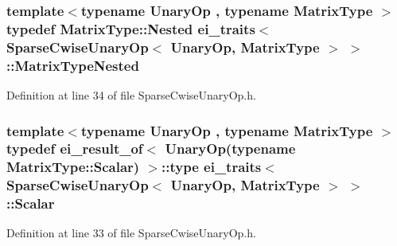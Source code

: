 \hypertarget{structei__traits_3_01_sparse_cwise_unary_op_3_01_unary_op_00_01_matrix_type_01_4_01_4_a7e6d89c823ad15cabb91e353ed6b4786}{
\subsubsection[{Matrix\-Type\-Nested}]{\setlength{\rightskip}{0pt plus 5cm}template$<$typename Unary\-Op , typename Matrix\-Type $>$ typedef Matrix\-Type\-::\-Nested {\bf ei\-\_\-traits}$<$ {\bf Sparse\-Cwise\-Unary\-Op}$<$ Unary\-Op, Matrix\-Type $>$ $>$\-::{\bf Matrix\-Type\-Nested}}}\label{structei__traits_3_01_sparse_cwise_unary_op_3_01_unary_op_00_01_matrix_type_01_4_01_4_a7e6d89c823ad15cabb91e353ed6b4786}


Definition at line 34 of file Sparse\-Cwise\-Unary\-Op.\-h.

\hypertarget{structei__traits_3_01_sparse_cwise_unary_op_3_01_unary_op_00_01_matrix_type_01_4_01_4_ad367b56d9d8e6da1261047e6c2152e63}{
\subsubsection[{Scalar}]{\setlength{\rightskip}{0pt plus 5cm}template$<$typename Unary\-Op , typename Matrix\-Type $>$ typedef {\bf ei\-\_\-result\-\_\-of}$<$ Unary\-Op(typename Matrix\-Type\-::\-Scalar) $>$\-::{\bf type} {\bf ei\-\_\-traits}$<$ {\bf Sparse\-Cwise\-Unary\-Op}$<$ Unary\-Op, Matrix\-Type $>$ $>$\-::{\bf Scalar}}}\label{structei__traits_3_01_sparse_cwise_unary_op_3_01_unary_op_00_01_matrix_type_01_4_01_4_ad367b56d9d8e6da1261047e6c2152e63}


Definition at line 33 of file Sparse\-Cwise\-Unary\-Op.\-h.



